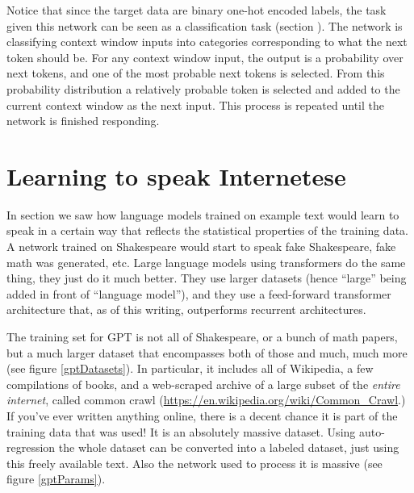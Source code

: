 Notice that since the target data are binary one-hot encoded labels, the task given this network can be seen as a classification task (section ). The network is classifying context window inputs into categories corresponding to what the next token should be.  For any context window input, the output is a probability over next tokens, and one of the most probable next tokens is selected. From this probability distribution a relatively probable token is selected and added to the current context window as the next input. This process is repeated until the network is finished responding.

\section{Learning to speak Internetese}

In section  we saw how language models trained on example text would learn to speak in a certain way that reflects the statistical properties of the training data. A network trained on Shakespeare would start to speak fake Shakespeare, fake math was generated, etc. 
Large language models using transformers do the same thing, they just do it much better. They use larger datasets (hence ``large'' being added in front of ``language model''), and they use a feed-forward transformer architecture that, as of this writing, outperforms recurrent architectures. 

The training set for GPT is not all of Shakespeare, or a bunch of math papers, but a much larger dataset that encompasses both of those and much, much more (see figure \ref{gptDatasets}).  In particular, it includes all of Wikipedia, a few compilations of books, and a web-scraped archive of a large subset of the \emph{entire internet}, called common crawl (\url{https://en.wikipedia.org/wiki/Common_Crawl}.) If you've ever written anything online, there is a decent chance it is part of the training data that was used! It is an absolutely massive dataset. Using auto-regression the whole dataset can be converted into a labeled dataset, just using this freely available text.  Also the network used to process it is massive (see figure \ref{gptParams}). 

